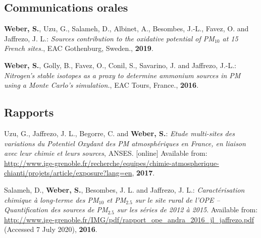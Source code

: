 \subsection{Communications orales}

\begin{etaremune}
    \item \textbf{Weber, S.}, Uzu, G., Salameh, D., Albinet, A., Besombes, J.-L., Favez,
        O. and Jaffrezo, J. L.:
        \textit{Sources contribution to the oxidative potential of PM$_{10}$ at
        15 French sites.}, EAC Gothenburg, Sweden., \textbf{2019}.
    \item \textbf{Weber, S.}, Golly, B., Favez, O., Conil, S., Savarino, J. and Jaffrezo,
        J.-L.:
        \textit{Nitrogen’s stable isotopes as a proxy to determine ammonium sources in PM
        using a Monte Carlo’s simulation.}, EAC Tours, France., \textbf{2016}.
\end{etaremune}

\subsection{Rapports}
\begin{etaremune}
    \item Uzu, G., Jaffrezo, J. L., Begorre, C. and \textbf{Weber, S.}: 
        \textit{Etude multi-sites des variations du Potentiel Oxydant des PM
        atmosphériques en France, en liaison avec leur chimie et leurs sources},
        ANSES.  [online] Available from:
        \url{http://www.ige-grenoble.fr/recherche/equipes/chimie-atmospherique-chianti/projets/article/exposure?lang=en},
        \textbf{2017}.
    \item Salameh, D., \textbf{Weber, S.}, Besombes, J. L. and Jaffrezo, J. L.:
        \textit{Caractérisation chimique à long-terme des PM$_{10}$ et PM$_{2.5}$ sur le
            site rural de l’OPE – Quantification des sources de PM$_{2.5}$ sur les séries de
        2012 à 2015}. 
        Available from:
        \url{http://www.ige-grenoble.fr/IMG/pdf/rapport_ope_andra_2016_jl_jaffrezo.pdf}
        (Accessed 7 July 2020), \textbf{2016}.
\end{etaremune}

